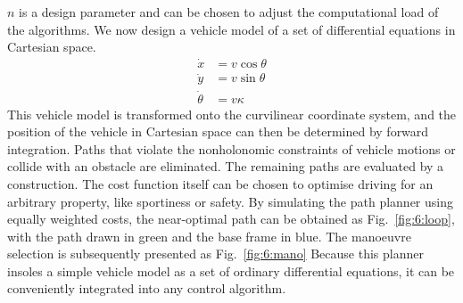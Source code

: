 $n$ is a design parameter and can be chosen to adjust the computational load of the algorithms.
We now design a vehicle model of a set of differential equations in Cartesian space.
\begin{subequations}
	\begin{align}
	\dot{x} &= v \cos\theta \\
	\dot{y} &= v \sin\theta \\
	\dot{\theta} &= v\kappa
	\end{align}
\end{subequations}
This vehicle model is transformed onto the curvilinear coordinate system, and the position of the vehicle in Cartesian space can then be determined by forward integration.
Paths that violate the nonholonomic constraints of vehicle motions or collide with an obstacle are eliminated.
The remaining paths are evaluated by a construction. 
The cost function itself can be chosen to optimise driving for an arbitrary property, like sportiness or safety.
By simulating the path planner using equally weighted costs, the near-optimal path can be obtained as Fig.~\ref{fig:6:loop}, with the path drawn in green and the base frame in blue. The manoeuvre selection is subsequently presented as Fig.~\ref{fig:6:mano} 
Because this planner insoles a simple vehicle model as a set of ordinary differential equations, it can be conveniently integrated into any control algorithm.


